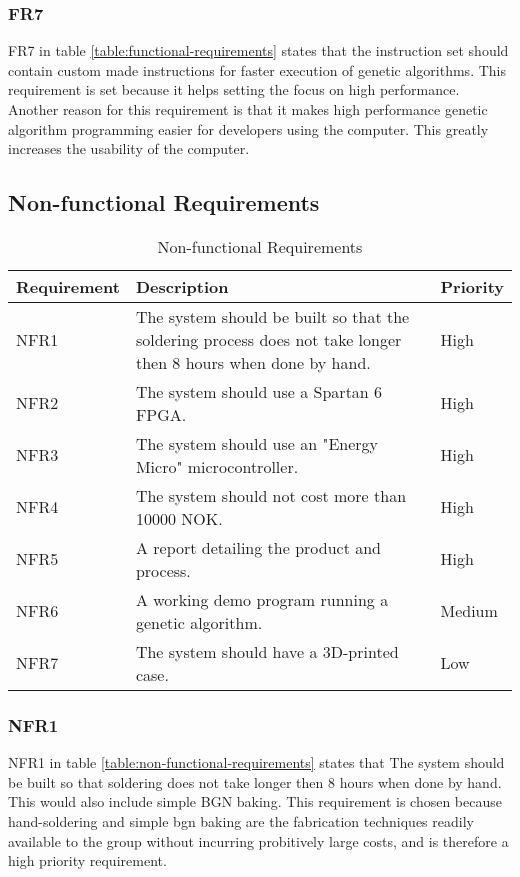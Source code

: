 \subsubsection{FR7}

FR7 in table \vref{table:functional-requirements} states that the instruction set should contain custom made instructions for faster execution of genetic algorithms.
This requirement is set because it helps setting the focus on high performance.
Another reason for this requirement is that it makes high performance genetic algorithm programming easier for developers using the computer.
This greatly increases the usability of the computer.

\subsection{Non-functional Requirements}

\begin{table}[H]
\begin{center}
\begin{tabular}{| l | p{7cm} | l |}
\hline
Requirement & Description & Priority \\
\hline
NFR1 & The system should be built so that the soldering process does not take longer then 8 hours when done by hand. & High \\
NFR2 & The system should use a Spartan 6 FPGA. & High\\
NFR3 & The system should use an "Energy Micro" microcontroller. & High \\
NFR4 & The system should not cost more than 10000 NOK. & High \\
NFR5 & A report detailing the product and process. & High \\
NFR6 & A working demo program running a genetic algorithm. & Medium \\
NFR7 & The system should have a 3D-printed case. & Low \\
\hline
\end{tabular}
\caption{Non-functional Requirements}
\label{table:non-functional-requirements}
\end{center}
\end{table}

\subsubsection{NFR1}

NFR1 in table \vref{table:non-functional-requirements} states that The system should be built so that soldering does not take longer then 8 hours when done by hand. This would also include simple BGN baking.
This requirement is chosen because hand-soldering and simple bgn baking are the fabrication techniques readily available to the group without incurring probitively large costs, and is therefore a high priority requirement.

